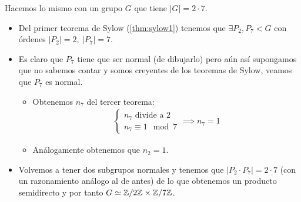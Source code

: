\begin{ej}
	Hacemos lo mismo con un grupo $G$ que tiene $|G| = 2\cdot 7$.
	\begin{itemize}
		\item Del primer teorema de Sylow (\ref{thm:sylow1}) tenemos que $\exists P_2, P_7 < G$ con órdenes $|P_2| = 2,\ |P_7| = 7$.
		\item Es claro que $P_7$ tiene que ser normal (de dibujarlo) pero aún así supongamos que no sabemos contar y somos creyentes de los teoremas de Sylow, veamos que $P_7$ es normal.
		\begin{itemize}
			\item Obtenemos $n_7$ del tercer teorema:
			\begin{align*}
				\begin{cases}
				n_7 \text{ divide a } 2 \\
				n_7 \equiv 1 \mod 7
				\end{cases} \implies n_7 = 1
			\end{align*}
			\item Análogamente obtenemos que $n_2 = 1$.
		\end{itemize}
		\item Volvemos a tener dos subgrupos normales y tenemos que $|P_2 \cdot P_7| = 2 \cdot 7$ (con un razonamiento análogo al de antes) de lo que obtenemos un producto semidirecto y por tanto $G \simeq \mathbb{Z}/2\mathbb{Z} \times \mathbb{Z}/7\mathbb{Z}$.
	\end{itemize}
\end{ej}

